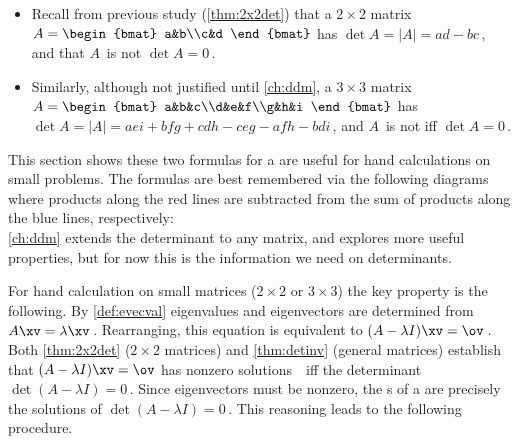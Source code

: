\begin{itemize}
\item Recall from previous study (\cref{thm:2x2det}) that a \(2\times 2\) matrix \(A=\begin{bmat} a&b\\c&d \end{bmat}\) has  \(\det A=|A|=ad-bc\)\,, and that \(A\)~is not   \(\det A=0\)\,.
\item Similarly, although not justified until \cref{ch:ddm}, a \(3\times 3\) matrix \(A=\begin{bmat} a&b&c\\d&e&f\\g&h&i \end{bmat}\) has  \(\det A=|A|=aei+bfg+cdh-ceg-afh-bdi\)\,, and \(A\)~is not  iff \(\det A=0\)\,.
\end{itemize}
This section shows these two formulas for a  are useful for hand calculations on small problems.
The formulas are best remembered via the following diagrams where products along the red lines are subtracted from the sum of products along the blue lines, respectively:
\begin{equation}

\label{eq:dets23}
\end{equation}
\cref{ch:ddm} extends the determinant to any  matrix, and explores more useful properties, but for now this is the information we need on determinants.


For hand calculation on small matrices (\(2\times 2\) or \(3\times3\)) the key property is the following.
By \cref{def:evecval} eigenvalues and eigenvectors are determined from \(A\xv=\lambda\xv\)\,.  
Rearranging, this equation is equivalent to \((A-\lambda I)\xv=\ov\)\,.  
Both \cref{thm:2x2det} (\(2\times2\) matrices) and \cref{thm:detinv} (general matrices) establish that \((A-\lambda I)\xv=\ov\) has nonzero solutions~\xv\ iff the determinant \(\det(A-\lambda I)=0\)\,.
Since eigenvectors must be nonzero, the s of a  are precisely the solutions of \(\det(A-\lambda I)=0\)\,. 
This reasoning leads to the following procedure.


